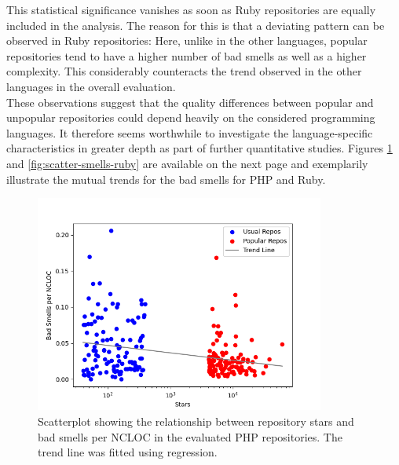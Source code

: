 \documentclass[a4paper, 12pt]{article}
\begin{document}
This statistical significance vanishes as soon as Ruby repositories are equally included in the analysis. The reason for this is that a deviating pattern can be observed in Ruby repositories: Here, unlike in the other languages, popular repositories tend to have a higher number of bad smells as well as a higher complexity. This considerably counteracts the trend observed in the other languages in the overall evaluation.\\

These observations suggest that the quality differences between popular and unpopular repositories could depend heavily on the considered programming languages. It therefore seems worthwhile to investigate the language-specific characteristics in greater depth as part of further quantitative studies. Figures \ref{fig:scatter-smells} and \ref{fig:scatter-smells-ruby} are available on the next page and exemplarily illustrate the mutual trends for the bad smells for PHP and Ruby.\\

\begin{figure}[h!]
  \centering
  \includegraphics[width=0.85\textwidth]{./media/php-smells-scatterplot.png}
  \caption{Scatterplot showing the relationship between repository stars and bad smells per NCLOC in the evaluated PHP repositories. The trend line was fitted using regression.}
  \label{fig:scatter-smells}
\end{figure}
\end{document}
